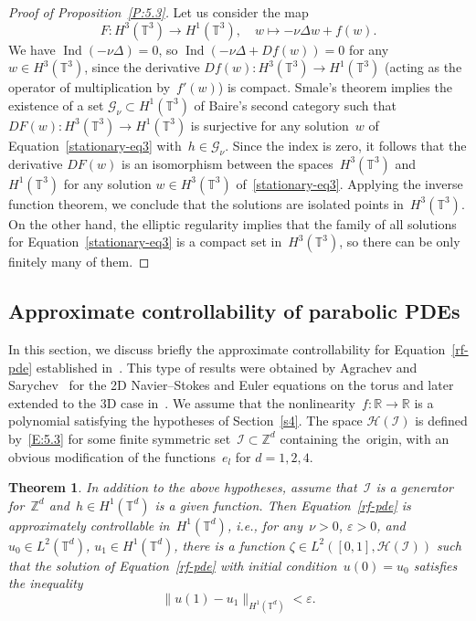 \documentclass[11pt]{article}
\newcommand{\ie}{i.e.,\xspace}
\theoremstyle{plain}
\newtheorem{theorem}{Theorem}[section]
\theoremstyle{definition}
\let\mathcal\mathscr
\theoremstyle{plain}
\numberwithin{equation}{section}
\let\e\varepsilon
\newcommand{\R}{{\mathbb R}}
\newcommand{\Z}{{\mathbb Z}}
\newcommand{\T}{{\mathbb T}}
\DeclareMathOperator{\Ind}{Ind}
\newcommand{\GG}{{\mathcal G}}
\newcommand{\HH}{{\mathcal H}}
\newcommand{\II}{{\mathcal I}}
\begin{document}
\begin{proof}[Proof of Proposition~\ref{P:5.3}]
Let us consider the map
\[
F:H^3(\T^3)\to H^1(\T^3), \quad w\mapsto -\nu\Delta w+f(w).
\]
We have $\Ind(-\nu \Delta)=0$, so $\Ind(-\nu \Delta+Df(w))=0$ for any~$w\in H^3(\T^3)$, since the derivative $Df(w):H^3(\T^3)\to H^1(\T^3)$ (acting as the operator of multiplication by~$f'(w)$) is compact. Smale's theorem implies the existence of a set $\GG_\nu\subset H^1(\T^3)$ of Baire's second category such that $DF(w):H^3(\T^3)\to H^1(\T^3)$ is surjective for any solution~$w$ of Equation~\eqref{stationary-eq3} with~$h\in \GG_\nu$. Since the index is zero, it follows that the derivative $DF(w)$ is an isomorphism between the spaces~$H^3(\T^3)$ and~$H^1(\T^3)$ for any solution $w\in H^3(\T^3)$ of~\eqref{stationary-eq3}. Applying the inverse function theorem, we conclude that the solutions are isolated points in~$H^3(\T^3)$. On the other hand, the elliptic regularity implies that the family of all solutions for Equation~\eqref{stationary-eq3} is a compact set in~$H^3(\T^3)$, so there can be only finitely many of them.
\end{proof}

\subsection{Approximate controllability of parabolic PDEs}\label{S:5.4}
In this section, we discuss briefly the approximate controllability for Equation~\eqref{rf-pde} established in~\cite{nersesyan-2020}. This type of results were obtained by Agrachev and Sarychev~\cite{AS-2005, AS-2006} for the 2D Navier--Stokes and Euler equations on the torus and later extended to the 3D case in~\cite{shirikyan-cmp2006,nersisyan-2010}. We assume that the nonlinearity~$f:\R\to \R$ is a polynomial satisfying the hypotheses of Section~\ref{s4}. The space $\HH(\II)$ is defined by~\eqref{E:5.3} for some finite symmetric set~$\II\subset\Z^d$ containing the~origin, with an obvious modification of the functions~$e_l$ for $d=1,2, 4$.

\begin{theorem}\label{T:5.5}
In addition to the above hypotheses, assume that~$\II$ is a generator for~$\Z^d$ and~$h\in H^1(\T^d)$ is a given function. Then Equation~\eqref{rf-pde} is approximately controllable in~$H^1(\T^d)$, \ie for any~$\nu>0$, $\e>0$, and $u_0\in L^2(\T^d)$, $u_1\in H^1(\T^d)$, there is a function $\zeta\in L^2([0,1], \HH(\II))$ such that the solution of Equation~\eqref{rf-pde} with initial condition~$u(0)=u_0$ satisfies the inequality
\[
\|u(1) - u_1 \|_{H^1(\T^d)}<\e.
\]
\end{theorem}
\end{document}
